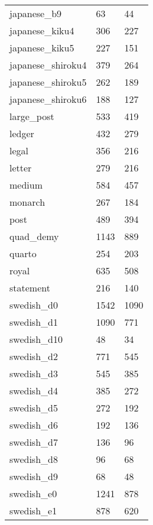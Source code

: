 {\begin{supertabular}{|lll|}
               japanese\_b9 &     63 &     44\\ \shrinkheight{5mm}
            japanese\_kiku4 &    306 &    227\\
            japanese\_kiku5 &    227 &    151\\
         japanese\_shiroku4 &    379 &    264\\
         japanese\_shiroku5 &    262 &    189\\
         japanese\_shiroku6 &    188 &    127\\
                large\_post &    533 &    419\\
                     ledger &    432 &    279 \\
                      legal &    356 &    216 \\
                     letter &    279 &    216 \\
                     medium &    584 &    457 \\
                    monarch &    267 &    184 \\
                       post &    489 &    394 \\
                 quad\_demy &   1143 &   889 \\
                     quarto &    254 &    203 \\
                      royal &    635 &    508 \\
                  statement &    216 &    140 \\
                swedish\_d0 &   1542 &   1090 \\
                swedish\_d1 &   1090 &    771 \\
               swedish\_d10 &     48 &     34 \\
                swedish\_d2 &    771 &    545 \\
                swedish\_d3 &    545 &    385 \\
                swedish\_d4 &    385 &    272 \\
                swedish\_d5 &    272 &    192 \\
                swedish\_d6 &    192 &    136 \\
                swedish\_d7 &    136 &     96 \\
                swedish\_d8 &     96 &     68 \\
                swedish\_d9 &     68 &     48 \\
                swedish\_e0 &   1241 &    878 \\
                swedish\_e1 &    878 &    620 \\

\end{supertabular}}
